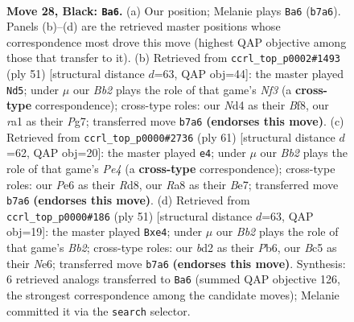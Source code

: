 \documentclass[11pt]{article}
\begin{document}
\clearpage

\begin{figure}[p]\centering
\begin{subfigure}{0.46\textwidth}\centering
\resizebox{\linewidth}{!}{%
\newchessgame
\chessboard[
  setfen={r2k3N/1b6/2p1p3/P1b1P2p/3n1P1P/1p6/3B3K/RN6 b - - 2 28},
  showmover=false,
  pgfstyle=straightmove, color=movearrow, markmove={b7-a6}
]}
\caption{}
\end{subfigure}\hfill
\begin{subfigure}{0.46\textwidth}\centering
\resizebox{\linewidth}{!}{%
\newchessgame
\chessboard[
  setfen={5b2/3r1kp1/p1p2n2/7p/2RPpP1P/6P1/1P1BK3/3N4 b - - 1 26},
  showmover=false,
  pgfstyle=straightmove, color=movearrow, markmove={f6-d5}
]}
\caption{}
\end{subfigure}
\\[4pt]
\begin{subfigure}{0.46\textwidth}\centering
\resizebox{\linewidth}{!}{%
\newchessgame
\chessboard[
  setfen={3r2k1/4bpp1/1p6/3np1PP/8/1NP5/1P1B4/1K4R1 b - - 0 31},
  showmover=false,
  pgfstyle=straightmove, color=movearrow, markmove={e5-e4}
]}
\caption{}
\end{subfigure}\hfill
\begin{subfigure}{0.46\textwidth}\centering
\resizebox{\linewidth}{!}{%
\newchessgame
\chessboard[
  setfen={r7/1bp3k1/1p2np1p/8/2P1N3/P2P2P1/R5BP/6K1 b - - 4 26},
  showmover=false,
  pgfstyle=straightmove, color=movearrow, markmove={b7-e4}
]}
\caption{}
\end{subfigure}
\caption{\textbf{Move 28, Black: \texttt{Ba6}.} (a) Our position; Melanie plays \texttt{Ba6} (\texttt{b7a6}). Panels (b)--(d) are the retrieved master positions whose correspondence most drove this move (highest QAP objective among those that transfer to it). (b) Retrieved from \texttt{ccrl\_top\_p0002\#1493} (ply 51) [structural distance $d$=63, QAP obj=44]: the master played \texttt{Nd5}; under $\mu$ our \emph{Bb2} plays the role of that game's \emph{Nf3} (a \textbf{cross-type} correspondence); cross-type roles: our \emph{N}d4 as their \emph{B}f8, our \emph{r}a1 as their \emph{P}g7; transferred move \texttt{b7a6} \textbf{(endorses this move)}. (c) Retrieved from \texttt{ccrl\_top\_p0000\#2736} (ply 61) [structural distance $d$=62, QAP obj=20]: the master played \texttt{e4}; under $\mu$ our \emph{Bb2} plays the role of that game's \emph{Pe4} (a \textbf{cross-type} correspondence); cross-type roles: our \emph{P}e6 as their \emph{R}d8, our \emph{R}a8 as their \emph{B}e7; transferred move \texttt{b7a6} \textbf{(endorses this move)}. (d) Retrieved from \texttt{ccrl\_top\_p0000\#186} (ply 51) [structural distance $d$=63, QAP obj=19]: the master played \texttt{Bxe4}; under $\mu$ our \emph{Bb2} plays the role of that game's \emph{Bb2}; cross-type roles: our \emph{b}d2 as their \emph{P}b6, our \emph{B}c5 as their \emph{N}e6; transferred move \texttt{b7a6} \textbf{(endorses this move)}. Synthesis: 6 retrieved analogs transferred to \texttt{Ba6} (summed QAP objective 126, the strongest correspondence among the candidate moves); Melanie committed it via the \texttt{search} selector.}
\label{fig:thought-m55}
\end{figure}
\end{document}
